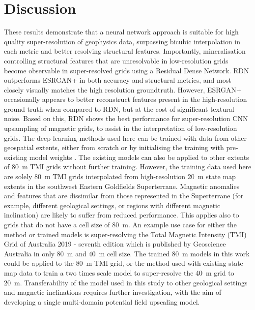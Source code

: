 \documentclass[manuscript.tex]{subfiles}
\begin{document}
\section{Discussion}
These results demonstrate that a neural network approach is suitable for high quality super-resolution of geophysics data, surpassing bicubic interpolation in each metric and better resolving structural features.
Importantly, mineralisation controlling structural features that are unresolvable in low-resolution grids become observable in super-resolved grids using a Residual Dense Network.
RDN\textdaggerdbl{} outperforms ESRGAN+ in both accuracy and structural metrics, and most closely visually matches the high resolution groundtruth.
However, ESRGAN+ occasionally appears to better reconstruct features present in the high-resolution ground truth when compared to RDN\textdaggerdbl{}, but at the cost of significant textural noise.
Based on this, RDN\textdaggerdbl{} shows the best performance for super-resolution CNN upsampling of magnetic grids, to assist in the interpretation of low-resolution grids.
The deep learning methods used here can be trained with data from other geospatial extents, either from scratch or by initialising the training with pre-existing model weights \parencite[][e.g.]{wangMineGANEffectiveKnowledge2020}.
The existing models can also be applied to other extents of \qty{80}{\metre} TMI grids without further training.
However, the training data used here are solely \qty{80}{\metre} TMI grids interpolated from high-resolution \qty{20}{\metre} state map extents in the southwest Eastern Goldfields Superterrane.
Magnetic anomalies and features that are dissimilar from those represented in the Superterrane (for example, different geological settings, or regions with different magnetic inclination) are likely to suffer from reduced performance.
This applies also to grids that do not have a cell size of \qty{80}{\metre}.
An example use case for either the method or trained models is super-resolving the Total Magnetic Intensity (TMI) Grid of Australia 2019 - seventh edition which is published by Geoscience Australia in only \qty{80}{\metre} and \qty{40}{\metre} cell size.
The trained \qty{80}{\metre} models in this work could be applied to the \qty{80}{\metre} TMI grid, or the method used with existing state map data to train a two times scale model to super-resolve the \qty{40}{\metre} grid to \qty{20}{\metre}.
Transferability of the model used in this study to other geological settings and magnetic inclinations requires further investigation, with the aim of developing a single multi-domain potential field upscaling model.
\end{document}
